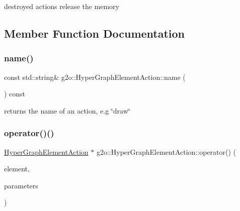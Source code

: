destroyed actions release the memory 



\subsection{Member Function Documentation}
\mbox{\label{classg2o_1_1_hyper_graph_element_action_aee0238f29b377b432c61e842ba6327ac}} 
\subsubsection{\texorpdfstring{name()}{name()}}
{\footnotesize\ttfamily const std\+::string\& g2o\+::\+Hyper\+Graph\+Element\+Action\+::name (\begin{DoxyParamCaption}{ }\end{DoxyParamCaption}) const\hspace{0.3cm}{\ttfamily [inline]}}



returns the name of an action, e.\+g \char`\"{}draw\char`\"{} 

\mbox{\label{classg2o_1_1_hyper_graph_element_action_a2faab4a1cdaf5fc010cb9c8627b7d361}} 
\subsubsection{\texorpdfstring{operator()()}{operator()()}\hspace{0.1cm}{\footnotesize\ttfamily [1/2]}}
{\footnotesize\ttfamily \mbox{\hyperlink{classg2o_1_1_hyper_graph_element_action}{Hyper\+Graph\+Element\+Action}} $\ast$ g2o\+::\+Hyper\+Graph\+Element\+Action\+::operator() (\begin{DoxyParamCaption}\item[{\mbox{\hyperlink{structg2o_1_1_hyper_graph_1_1_hyper_graph_element}{Hyper\+Graph\+::\+Hyper\+Graph\+Element}} $\ast$}]{element,  }\item[{\mbox{\hyperlink{structg2o_1_1_hyper_graph_element_action_1_1_parameters}{Hyper\+Graph\+Element\+Action\+::\+Parameters}} $\ast$}]{parameters }\end{DoxyParamCaption})\hspace{0.3cm}{\ttfamily [virtual]}}



